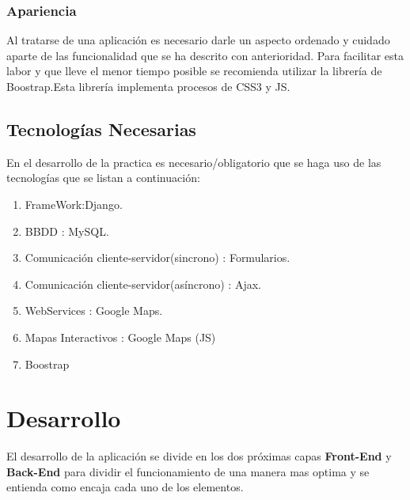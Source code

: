 \subsubsection*{Apariencia}
Al tratarse de una aplicación es necesario darle un aspecto ordenado y cuidado aparte de las funcionalidad que se ha descrito con anterioridad. Para facilitar esta labor y que lleve el menor tiempo posible se recomienda utilizar la librería de Boostrap.Esta librería implementa procesos de CSS3 y JS.
\subsection{Tecnologías Necesarias}
En el desarrollo de la practica es necesario/obligatorio que se haga uso de las tecnologías que se listan a continuación:
\begin{enumerate}
\item FrameWork:Django.
\item BBDD : MySQL.
\item Comunicación cliente-servidor(sincrono) : Formularios.
\item Comunicación cliente-servidor(asíncrono) : Ajax.
\item WebServices : Google Maps.
\item Mapas Interactivos : Google Maps (JS)
\item Boostrap
\end{enumerate}
\section{Desarrollo}
El desarrollo de la aplicación se divide en los dos próximas capas \textbf{Front-End} y \textbf{Back-End} para dividir el funcionamiento de una manera mas optima y se entienda como encaja cada uno de los elementos.
